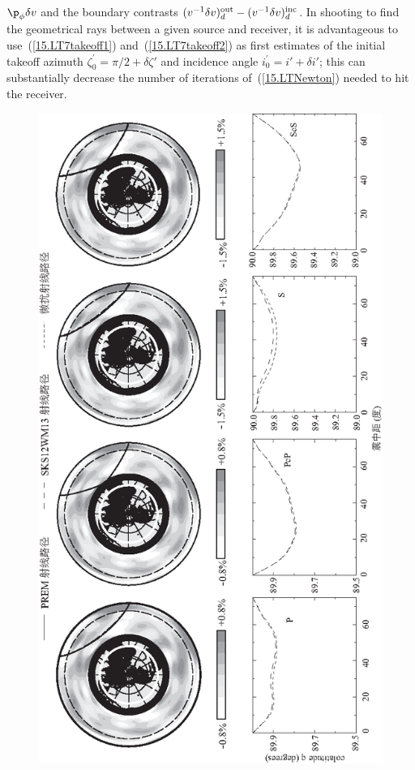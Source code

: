{$\p_{\phi}\delta v$ and the boundary contrasts
$(v^{-1}\delta v)_d^{\rm out}
-(v^{-1}\delta v)_d^{\rm inc}$.
In shooting to find the geometrical rays
%
between a given source and receiver,
it is advantageous to use~(\ref{15.LT7takeoff1})
and~(\ref{15.LT7takeoff2}) as first estimates
of the initial takeoff azimuth $\zeta_0^{\prime}
=\pi/2+\delta\zeta'$ and incidence angle $i_0^{\prime}
=i'+\delta i'$; this can substantially decrease the
number of iterations of~(\ref{15.LTNewton}) needed
to hit the receiver.
\begin{figure}
\begin{center}
{
\includegraphics{../figures/chap15/fig12.eps}
}
\end{center}
\end{figure}}
